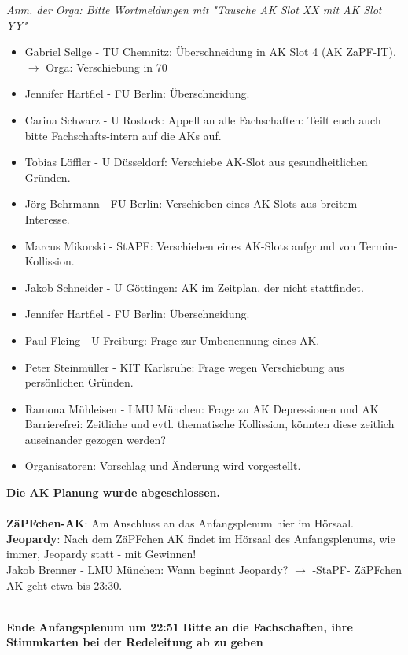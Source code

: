   \textit{Anm. der Orga: Bitte Wortmeldungen mit "Tausche AK Slot XX mit AK Slot YY"}
  \begin{itemize}
    \item Gabriel Sellge - TU Chemnitz:  Überschneidung in AK Slot 4 (AK ZaPF-IT). $\rightarrow$ Orga: Verschiebung in 70
    \item Jennifer Hartfiel - FU Berlin:  Überschneidung.
    \item Carina Schwarz - U Rostock:  Appell an alle Fachschaften: Teilt euch auch bitte Fachschafts-intern auf die AKs auf.
    \item Tobias Löffler - U Düsseldorf:  Verschiebe AK-Slot aus gesundheitlichen Gründen.
    \item Jörg Behrmann - FU Berlin:  Verschieben eines AK-Slots aus breitem Interesse.
    \item Marcus Mikorski - StAPF:  Verschieben eines AK-Slots aufgrund von Termin-Kollission.
    \item Jakob Schneider - U Göttingen:  AK im Zeitplan, der nicht stattfindet.
    \item Jennifer Hartfiel - FU Berlin:  Überschneidung.
    \item Paul Fleing - U Freiburg:  Frage zur Umbenennung eines AK.
    \item Peter Steinmüller - KIT Karlsruhe:  Frage wegen Verschiebung aus persönlichen Gründen.
    \item Ramona Mühleisen - LMU München:  Frage zu AK Depressionen und AK Barrierefrei: Zeitliche und evtl. thematische Kollission, könnten diese zeitlich auseinander gezogen werden?
    \item Organisatoren: Vorschlag und Änderung wird vorgestellt.
  \end{itemize}
  \textbf{Die AK Planung wurde abgeschlossen.} \\ \\

  \textbf{ZäPFchen-AK}: Am Anschluss an das Anfangsplenum hier im Hörsaal. \\
  \textbf{Jeopardy}: Nach dem ZäPFchen AK findet im Hörsaal des Anfangsplenums, wie immer, Jeopardy statt - mit Gewinnen! \\
    Jakob Brenner - LMU München:  Wann beginnt Jeopardy? $\rightarrow$ -StaPF- ZäPFchen AK geht etwa bis 23:30. \\ \\

\begin{center}
  \textbf{Ende Anfangsplenum um 22:51}
  \textbf{Bitte an die Fachschaften, ihre Stimmkarten bei der Redeleitung ab zu geben}
\end{center}
